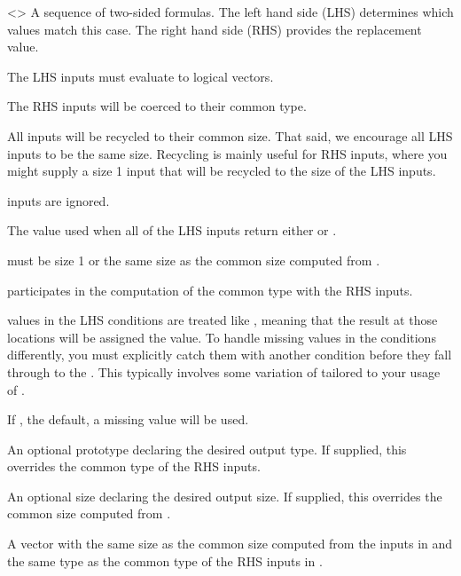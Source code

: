 \documentclass[a4paper]{book}
\begin{document}
%
\begin{Arguments}
\begin{ldescription}
\item[\code{...}] <> A sequence of two-sided
formulas. The left hand side (LHS) determines which values match this case.
The right hand side (RHS) provides the replacement value.

The LHS inputs must evaluate to logical vectors.

The RHS inputs will be coerced to their common type.

All inputs will be recycled to their common size. That said, we encourage
all LHS inputs to be the same size. Recycling is mainly useful for RHS
inputs, where you might supply a size 1 input that will be recycled to the
size of the LHS inputs.

 inputs are ignored.

\item[\code{.default}] The value used when all of the LHS inputs return either
 or .

 must be size 1 or the same size as the common size computed
from .

 participates in the computation of the common type with the RHS
inputs.

 values in the LHS conditions are treated like , meaning that
the result at those locations will be assigned the  value. To
handle missing values in the conditions differently, you must explicitly
catch them with another condition before they fall through to the
. This typically involves some variation of 
tailored to your usage of .

If , the default, a missing value will be used.

\item[\code{.ptype}] An optional prototype declaring the desired output type. If
supplied, this overrides the common type of the RHS inputs.

\item[\code{.size}] An optional size declaring the desired output size. If supplied,
this overrides the common size computed from .
\end{ldescription}
\end{Arguments}
%
\begin{Value}
A vector with the same size as the common size computed from the
inputs in  and the same type as the common type of the RHS inputs
in .
\end{Value}
\end{document}
